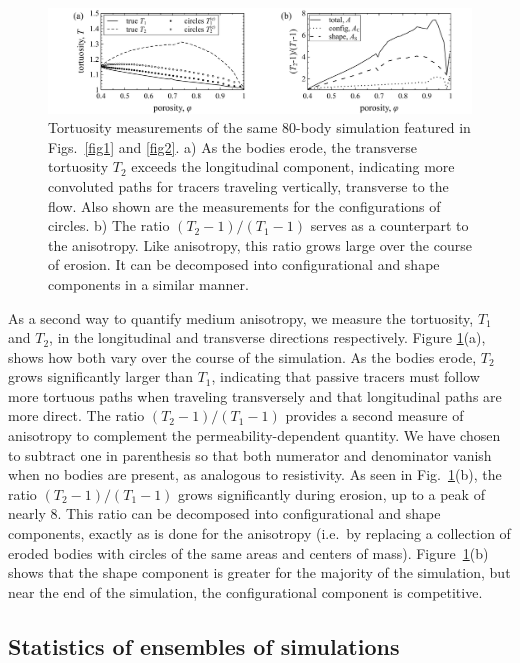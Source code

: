 \documentclass[3p]{elsarticle}
\begin{document}
\begin{figure}%
\centering
\includegraphics[width = 0.99 \textwidth]{./figs/fig4.pdf}
\caption{
Tortuosity measurements of the same 80-body simulation featured in Figs.~\ref{fig1} and \ref{fig2}. a) As the bodies erode, the transverse tortuosity $T_2$ exceeds the longitudinal component, indicating more convoluted paths for tracers traveling vertically, transverse to the flow. Also shown are the measurements for the configurations of circles. b) The ratio $(T_2-1)/(T_1-1)$ serves as a counterpart to the anisotropy. Like anisotropy, this ratio grows large over the course of erosion. It can be decomposed into configurational and shape components in a similar manner.
\label{fig4}
}
\end{figure}

As a second way to quantify medium anisotropy, we measure the tortuosity, $T_1$ and $T_2$, in the longitudinal and transverse directions respectively. Figure \ref{fig4}(a), shows how both vary over the course of the simulation. As the bodies erode, $T_2$ grows significantly larger than $T_1$, indicating that passive tracers must follow more tortuous paths when traveling transversely and that longitudinal paths are more direct. The ratio $(T_2-1)/(T_1-1)$ provides a second measure of anisotropy to complement the permeability-dependent quantity. We have chosen to subtract one in parenthesis so that both numerator and denominator vanish when no bodies are present, as analogous to resistivity. As seen in Fig.~\ref{fig4}(b), the ratio $(T_2-1)/(T_1-1)$ grows significantly during erosion, up to a peak of nearly 8. This ratio can be decomposed into configurational and shape components, exactly as is done for the anisotropy (i.e.~by replacing a collection of eroded bodies with circles of the same areas and centers of mass). Figure~\ref{fig4}(b) shows that the shape component is greater for the majority of the simulation, but near the end of the simulation, the configurational component is competitive. 


\subsection{Statistics of ensembles of simulations}
\end{document}
